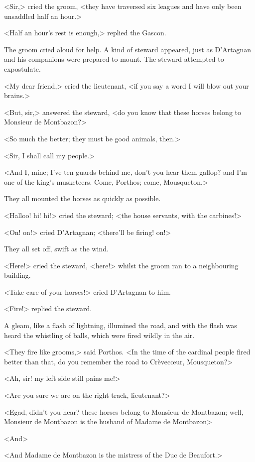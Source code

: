 <Sir,> cried the groom, <they have traversed six leagues and have only been unsaddled half an hour.>

<Half an hour's rest is enough,> replied the Gascon.

The groom cried aloud for help. A kind of steward appeared, just as D'Artagnan and his companions were prepared to mount. The steward attempted to expostulate.

<My dear friend,> cried the lieutenant, <if you say a word I will blow out your brains.>

<But, sir,> answered the steward, <do you know that these horses belong to Monsieur de Montbazon?>

<So much the better; they must be good animals, then.>

<Sir, I shall call my people.>

<And I, mine; I've ten guards behind me, don't you hear them gallop? and I'm one of the king's musketeers. Come, Porthos; come, Mousqueton.>

They all mounted the horses as quickly as possible.

<Halloo! hi! hi!> cried the steward; <the house servants, with the carbines!>

<On! on!> cried D'Artagnan; <there'll be firing! on!>

They all set off, swift as the wind.

<Here!> cried the steward, <here!> whilst the groom ran to a neighbouring building.

<Take care of your horses!> cried D'Artagnan to him.

<Fire!> replied the steward.

A gleam, like a flash of lightning, illumined the road, and with the flash was heard the whistling of balls, which were fired wildly in the air.

<They fire like grooms,> said Porthos. <In the time of the cardinal people fired better than that, do you remember the road to Crèvecœur, Mousqueton?>

<Ah, sir! my left side still pains me!>

<Are you sure we are on the right track, lieutenant?>

<Egad, didn't you hear? these horses belong to Monsieur de Montbazon; well, Monsieur de Montbazon is the husband of Madame de Montbazon\longdash>

<And\longdash>

<And Madame de Montbazon is the mistress of the Duc de Beaufort.>

